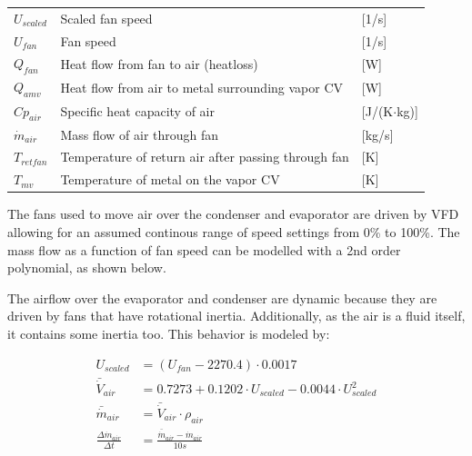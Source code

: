 \begin{center}
	\begin{tabular}{l p{10cm} l}
		$U_{scaled}$    & Scaled fan speed                                    & [1/\si{s}]                        \\
		$U_{fan}$       & Fan speed                                           & [1/\si{s}]                        \\
		$Q_{fan}$       & Heat flow from fan to air (heatloss)                & [\si{W}]                          \\
		$Q_{amv}$       & Heat flow from air to metal surrounding vapor CV    & [\si{W}]                          \\
		$Cp_{air}$      & Specific heat capacity of air                       & [\si{J}/(\si{K}$ \cdot $\si{kg})] \\
		$\dot{m}_{air}$ & Mass flow of air through fan                        & [\si{kg}/\si{s}]                  \\
		$T_{retfan}$    & Temperature of return air after passing through fan & [\si{K}]                          \\
		$T_{mv}$        & Temperature of metal on the vapor CV                & [\si{K}]
	\end{tabular}
\end{center}

The fans used to move air over the condenser and evaporator are driven by VFD allowing for an assumed continous range of speed settings from 0\% to 100\%. The mass flow as a function of fan speed can be modelled with a 2nd order polynomial, as shown below.

The airflow over the evaporator and condenser are dynamic because they are driven by fans that have rotational inertia. Additionally, as the air is a fluid itself, it contains some inertia too. This behavior is modeled by:

\begin{align}
	U_{scaled} & = (U_{fan} - 2270.4)\cdot 0.0017 \\
	\bar{\dot{V}}_{air} & = 0.7273 + 0.1202 \cdot U_{scaled}  -0.0044 \cdot U_{scaled}^2\\
	\bar{\dot{m}}_{air} & = \bar{\dot{V}}_{air} \cdot \rho_{air}  \label{eq:Evaporator_FanAirInstantMassFlow}\\
	\frac{\Delta \dot{m}_{air}}{\Delta t} & = \frac{\bar{\dot{m}}_{air}  - \dot{m}_{air}} {10s} \label{eq:Evaporator_FanAirRateOfChange}
\end{align}

